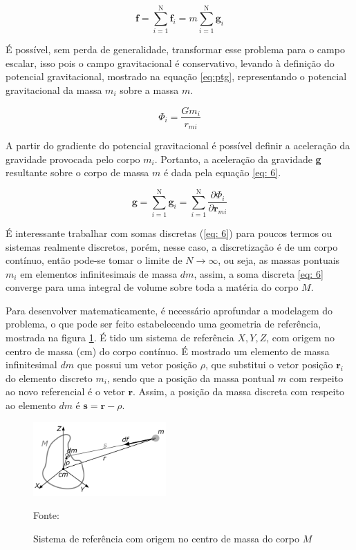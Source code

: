 \begin{equation}
\textbf{f} = \sum\limits_{i=1}^{\mbox{N}}\textbf{f}_{i} = m \sum\limits_{i=1}^{\mbox{N}}\textbf{g}_{i}
\label{eq: fresM}
\end{equation}

É possível, sem perda de generalidade, transformar esse problema para o campo escalar, isso pois o campo gravitacional é conservativo, levando à definição do potencial gravitacional, mostrado na equação \ref{eq:ptg}, representando o potencial gravitacional da massa $m_{i}$ sobre a massa $m$.

\begin{equation}
\Phi_{i} = \frac{Gm_{i}}{r_{mi}}
\label{eq:ptg}
\end{equation}

A partir do gradiente do potencial gravitacional é possível definir a aceleração da gravidade provocada pelo corpo $m_{i}$. Portanto, a aceleração da gravidade \textbf{g} resultante sobre o corpo de massa $m$ é dada pela equação \ref{eq: 6}.

\begin{equation}
\textbf{g} = \sum\limits_{i=1}^{\mbox{N}}\textbf{g}_{i} = \sum\limits_{i=1}^{\mbox{N}}\frac{\partial \Phi_{i}}{\partial \textbf{r}_{mi}}
\label{eq: 6}
\end{equation}

É interessante trabalhar com somas discretas (\ref{eq: 6}) para poucos termos ou sistemas realmente discretos, porém, nesse caso, a discretização é de um corpo contínuo, então pode-se tomar o limite de $N \rightarrow \infty$, ou seja, as massas pontuais $m_{i}$ em elementos infinitesimais de massa $dm$, assim, a soma discreta \ref{eq: 6} converge para uma integral de volume sobre toda a matéria do corpo $M$.

Para desenvolver matematicamente, é necessário aprofundar a modelagem do problema, o que pode ser feito estabelecendo uma geometria de referência, mostrada na figura \ref{fig:geometriaref}. É tido um sistema de referência $X, Y, Z$, com origem no centro de massa (cm) do corpo contínuo. É mostrado um elemento de massa infinitesimal $dm$ que possui um vetor posição $\rho$, que substitui o vetor posição $\textbf{r}_{i}$ do elemento discreto $m_{i}$, sendo que a posição da massa pontual $m$ com respeito ao novo referencial é o vetor $\textbf{r}$. Assim, a posição da massa discreta com respeito ao elemento $dm$ é $\textbf{s} = \textbf{r} - \rho$.

\begin{figure}[h]
        \centering
        \includegraphics[width=2in]{figuras/geometriaref.png}
        \caption{Sistema de referência com origem no centro de massa do corpo $M$}
        Fonte: \cite{livro:aris1989}
        \label{fig:geometriaref}
\end{figure} 

